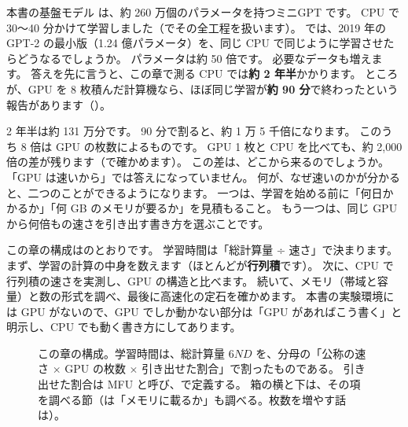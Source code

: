 本書の基盤モデル  は、約 260 万個のパラメータを持つミニGPT です。
CPU で 30〜40 分かけて学習しました（でその全工程を扱います）。
では、2019 年の GPT-2 の最小版（1.24 億パラメータ）を、同じ CPU で同じように学習させたらどうなるでしょうか。
パラメータは約 50 倍です。
必要なデータも増えます。
答えを先に言うと、この章で測る CPU では\textbf{約 2 年半}かかります。
ところが、GPU を 8 枚積んだ計算機なら、ほぼ同じ学習が\textbf{約 90 分}で終わったという報告があります（）。

2 年半は約 131 万分です。
90 分で割ると、約 1 万 5 千倍になります。
このうち 8 倍は GPU の枚数によるものです。
GPU 1 枚と CPU を比べても、約 2,000 倍の差が残ります（で確かめます）。
この差は、どこから来るのでしょうか。
「GPU は速いから」では答えになっていません。
何が、なぜ速いのかが分かると、二つのことができるようになります。
一つは、学習を始める前に「何日かかるか」「何 GB のメモリが要るか」を見積もること。
もう一つは、同じ GPU から何倍もの速さを引き出す書き方を選ぶことです。

この章の構成はのとおりです。
学習時間は「総計算量 ÷ 速さ」で決まります。
まず、学習の計算の中身を数えます（ほとんどが\textbf{行列積}です）。
次に、CPU で行列積の速さを実測し、GPU の構造と比べます。
続いて、メモリ（帯域と容量）と数の形式を調べ、最後に高速化の定石を確かめます。
本書の実験環境には GPU がないので、GPU でしか動かない部分は「GPU があればこう書く」と明示し、CPU でも動く書き方にしてあります。

\begin{figure}[tbp]
\centering
{}
\caption{この章の構成。学習時間は、総計算量 $6ND$ を、分母の「公称の速さ $\times$ GPU の枚数 $\times$ 引き出せた割合」で割ったものである。
引き出せた割合は MFU と呼び、で定義する。
箱の横と下は、その項を調べる節（は「メモリに載るか」も調べる。枚数を増やす話は）。}
\label{fig:gpu-map}
\end{figure}


